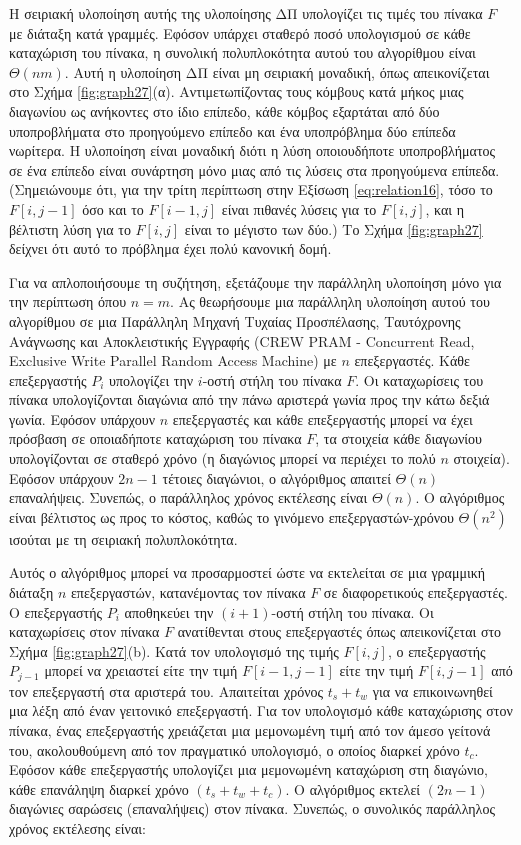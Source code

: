 \documentclass[12pt,a4paper]{article} %
\begin{document}
{{Η σειριακή υλοποίηση αυτής της υλοποίησης ΔΠ υπολογίζει τις τιμές
του πίνακα $F$ με διάταξη κατά γραμμές. Εφόσον υπάρχει σταθερό ποσό
υπολογισμού σε κάθε καταχώριση του πίνακα, η συνολική πολυπλοκότητα
αυτού του αλγορίθμου είναι $\Theta(nm)$. Αυτή η υλοποίηση ΔΠ είναι
μη σειριακή μοναδική, όπως απεικονίζεται στο Σχήμα \ref{fig:graph27}(α).
Αντιμετωπίζοντας τους κόμβους κατά μήκος μιας διαγωνίου ως ανήκοντες
στο ίδιο επίπεδο, κάθε κόμβος εξαρτάται από δύο υποπροβλήματα στο
προηγούμενο επίπεδο και ένα υποπρόβλημα δύο επίπεδα νωρίτερα. Η
υλοποίηση είναι μοναδική διότι η λύση οποιουδήποτε υποπροβλήματος
σε ένα επίπεδο είναι συνάρτηση μόνο μιας από τις λύσεις στα
προηγούμενα επίπεδα. (Σημειώνουμε ότι, για την τρίτη περίπτωση στην
Εξίσωση \ref{eq:relation16}, τόσο το $F[i, j-1]$ όσο και το $F[i-1, j]$ είναι
πιθανές λύσεις για το $F[i, j]$, και η βέλτιστη λύση για το $F[i, j]$
είναι το μέγιστο των δύο.) Το Σχήμα \ref{fig:graph27} δείχνει ότι αυτό το πρόβλημα
έχει πολύ κανονική δομή.

Για να απλοποιήσουμε τη συζήτηση, εξετάζουμε την παράλληλη υλοποίηση
μόνο για την περίπτωση όπου $n = m$. Ας θεωρήσουμε μια παράλληλη
υλοποίηση αυτού του αλγορίθμου σε μια Παράλληλη Μηχανή Τυχαίας 
Προσπέλασης, Ταυτόχρονης Ανάγνωσης και Αποκλειστικής Εγγραφής 
(CREW PRAM - Concurrent Read, Exclusive Write 
Parallel Random Access Machine) με $n$ επεξεργαστές.
Κάθε επεξεργαστής $P_i$ υπολογίζει την $i$-οστή στήλη του πίνακα $F$.
Οι καταχωρίσεις του πίνακα υπολογίζονται διαγώνια από την πάνω αριστερά
γωνία προς την κάτω δεξιά γωνία. Εφόσον υπάρχουν $n$ επεξεργαστές και 
κάθε επεξεργαστής μπορεί να έχει πρόσβαση σε οποιαδήποτε καταχώριση του 
πίνακα $F$, τα στοιχεία κάθε διαγωνίου υπολογίζονται σε σταθερό χρόνο 
(η διαγώνιος μπορεί να περιέχει το πολύ $n$ στοιχεία). Εφόσον υπάρχουν 
$2n - 1$ τέτοιες διαγώνιοι, ο αλγόριθμος απαιτεί $\Theta(n)$ επαναλήψεις. 
Συνεπώς, ο παράλληλος χρόνος εκτέλεσης είναι $\Theta(n)$. Ο αλγόριθμος 
είναι βέλτιστος ως προς το κόστος, καθώς το γινόμενο 
επεξεργαστών-χρόνου $\Theta(n^2)$ ισούται με τη σειριακή πολυπλοκότητα.

Αυτός ο αλγόριθμος μπορεί να προσαρμοστεί ώστε να εκτελείται σε μια 
γραμμική διάταξη $n$ επεξεργαστών, κατανέμοντας τον πίνακα $F$ σε 
διαφορετικούς επεξεργαστές. Ο επεξεργαστής $P_i$ αποθηκεύει την 
$(i + 1)$-οστή στήλη του πίνακα. Οι καταχωρίσεις στον πίνακα $F$ 
ανατίθενται στους επεξεργαστές όπως απεικονίζεται στο Σχήμα \ref{fig:graph27}(b). 
Κατά τον υπολογισμό της τιμής $F[i, j]$, ο επεξεργαστής $P_{j-1}$ 
μπορεί να χρειαστεί είτε την τιμή $F[i - 1, j - 1]$ είτε την τιμή 
$F[i, j - 1]$ από τον επεξεργαστή στα αριστερά του. Απαιτείται χρόνος 
$t_s + t_w$ για να επικοινωνηθεί μια λέξη από έναν γειτονικό επεξεργαστή.
Για τον υπολογισμό κάθε καταχώρισης στον πίνακα, ένας επεξεργαστής 
χρειάζεται μια μεμονωμένη τιμή από τον άμεσο γείτονά του, ακολουθούμενη 
από τον πραγματικό υπολογισμό, ο οποίος διαρκεί χρόνο $t_c$. Εφόσον 
κάθε επεξεργαστής υπολογίζει μια μεμονωμένη καταχώριση στη διαγώνιο, 
κάθε επανάληψη διαρκεί χρόνο $(t_s + t_w + t_c)$. Ο αλγόριθμος εκτελεί 
$(2n - 1)$ διαγώνιες σαρώσεις (επαναλήψεις) στον πίνακα. Συνεπώς, ο 
συνολικός παράλληλος χρόνος εκτέλεσης είναι:

}}
\end{document}
